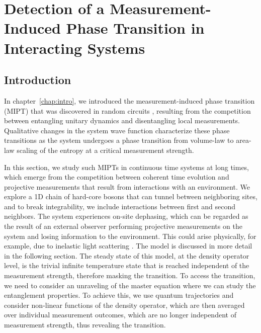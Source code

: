 \chapter{Detection of a Measurement-Induced Phase Transition in Interacting Systems}
\thispagestyle{empty}
\label{chap:MIPT_bosons}

\section{Introduction}


In chapter~\ref{chap:intro}, we introduced the measurement-induced phase transition (MIPT) that was discovered in random circuits \cite{li2018,li2019,skinner2019}, resulting from the competition between entangling unitary dynamics and disentangling local measurements. Qualitative changes in the system wave function characterize these phase transitions as the system undergoes a phase transition from volume-law to area-law scaling of the entropy at a critical measurement strength.

In this section, we study such MIPTs in continuous time systems at long times, which emerge from the competition between coherent time evolution and projective measurements that result from interactions with an environment. We explore a 1D chain of hard-core bosons that can tunnel between neighboring sites, and to break integrability, we include interactions between first and second neighbors. The system experiences on-site dephasing, which can be regarded as the result of an external observer performing projective measurements on the system and losing information to the environment. This could arise physically, for example, due to inelastic light scattering \cite{pichler2010,poletti2013,sarkar2014,luschen2017}. The model is discussed in more detail in the following section. The steady state of this model, at the density operator level, is the trivial infinite temperature state that is reached independent of the measurement strength, therefore masking the transition. To access the transition, we need to consider an unraveling of the master equation where we can study the entanglement properties. To achieve this, we use quantum trajectories and consider non-linear functions of the density operator, which are then averaged over individual measurement outcomes, which are no longer independent of measurement strength, thus revealing the transition.

